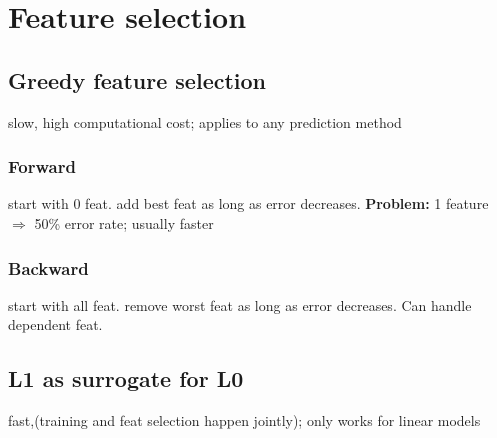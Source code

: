 \section*{Feature selection}
\subsection*{Greedy feature selection}
slow, high computational cost;
applies to any prediction method
\subsubsection*{Forward}
start with 0 feat. add best feat as long as error decreases.
\textbf{Problem:} 1 feature $\Rightarrow$ 50\% error rate;
usually faster
\subsubsection*{Backward}
start with all feat. remove worst feat as long as error decreases.
Can handle dependent feat.
\subsection*{L1 as surrogate for L0}
fast,(training and feat selection happen jointly);
only works for linear models